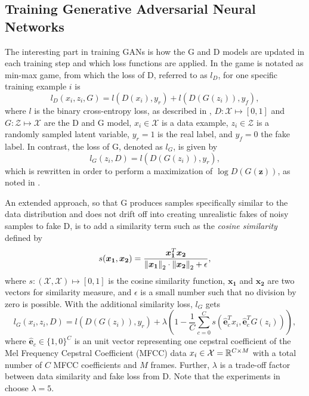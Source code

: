\subsection{Training Generative Adversarial Neural Networks}\label{sec:nn_adv_train}
The interesting part in training GANs is how the G and D models are updated in each training step and which loss functions are applied.
In  the game is notated as min-max game, from which the loss of D, referred to as $l_D$, for one specific training example $i$ is
\begin{equation}
  l_D(x_i, z_i, G) = l(D(x_i), y_r) + l(D(G(z_i)), y_f),
\end{equation}
where $l$ is the binary cross-entropy loss, as described in , $D: \mathcal{X} \mapsto [0, 1]$ and $G: \mathcal{Z} \mapsto \mathcal{X}$ are the D and G model, $x_i \in \mathcal{X}$ is a data example, $z_i \in \mathcal{Z}$ is a randomly sampled latent variable, $y_r = 1$ is the real label, and $y_f = 0$ the fake label.
In contrast, the loss of G, denoted as $l_G$, is given by
\begin{equation}
  l_G(z_i, D) =  l(D(G(z_i)), y_r),
\end{equation}
which is rewritten in order to perform a maximization of $\log D(G(\bm{z}))$, as noted in .

An extended approach, so that G produces samples specifically similar to the data distribution and does not drift off into creating unrealistic fakes of noisy samples to fake D, is to add a similarity term such as the \emph{cosine similarity} defined by
\begin{equation}
  s(\bm{x_1}, \bm{x_2}) = \frac{\bm{x_1}^T \bm{x_2}}{\norm{\bm{x_1}}_2 \cdot \norm{\bm{x_2}}_2 + \epsilon},
\end{equation}
where $s : (\mathcal{X}, \mathcal{X}) \mapsto [0, 1]$ is the cosine similarity function, $\bm{x_1}$ and $\bm{x_2}$ are two vectors for similarity measure, and $\epsilon$ is a small number such that no division by zero is possible.
With the additional similarity loss, $l_G$ gets
\begin{equation}
  l_G(x_i, z_i, D) =  l(D(G(z_i)), y_r) + \lambda \left(1 - \frac{1}{C} \sum_{c=0}^{C} s(\hat{\bm{e}}_c^T x_i , \hat{\bm{e}}_c^T G(z_i)) \right),
\end{equation}
where $\hat{\bm{e}}_c \in \{1, 0\}^C$ is an unit vector representing one cepstral coefficient of the Mel Frequency Cepstral Coefficient (MFCC) data $x_i \in \mathcal{X} = \mathbb{R}^{C \times M}$ with a total number of $C$ MFCC coefficients and $M$ frames.
Further, $\lambda$ is a trade-off factor between data similarity and fake loss from D.
Note that the experiments in  choose $\lambda = 5$.


